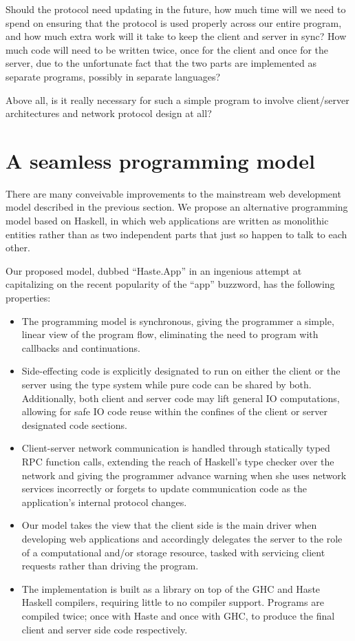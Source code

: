 \documentclass[preprint]{sigplanconf}
\begin{document}
Should the protocol need updating in the future, how much time will we need to
spend on ensuring that the protocol is used properly across our entire program,
and how much extra work will it take to keep the client and server in sync?
How much code will need to be written twice, once for the client and once for
the server, due to the unfortunate fact that the two parts are implemented as
separate programs, possibly in separate languages?

Above all, is it really necessary for such a simple program to involve
client/server architectures and network protocol design at all?

\section{A seamless programming model}

There are many conveivable improvements to the mainstream web development model
described in the previous section. We propose an alternative programming model
based on Haskell, in which web applications are written as monolithic entities
rather than as two independent parts that just so happen to talk to each other.

Our proposed model, dubbed ``Haste.App'' in an ingenious attempt at
capitalizing on the recent popularity of the ``app'' buzzword, has the
following properties:

\begin{itemize}
  \item The programming model is synchronous, giving the programmer a simple,
        linear view of the program flow, eliminating the need to program with
        callbacks and continuations.
  \item Side-effecting code is explicitly designated to run on either the
        client or the server using the type system while pure code can be
        shared by both. Additionally, both client and server code may lift
        general IO computations, allowing for safe IO code reuse within the
        confines of the client or server designated code sections.
  \item Client-server network communication is handled through statically typed
        RPC function calls, extending the reach of Haskell's type checker over
        the network and giving the programmer advance warning when she uses
        network services incorrectly or forgets to update communication code
        as the application's internal protocol changes.
  \item Our model takes the view that the client side is the main driver when
        developing web applications and accordingly delegates the server to
        the role of a computational and/or storage resource, tasked with
        servicing client requests rather than driving the program.
  \item The implementation is built as a library on top of the GHC and Haste
        Haskell compilers, requiring little to no compiler support. Programs
        are compiled twice; once with Haste and once with GHC, to produce the
        final client and server side code respectively.
\end{itemize}
\end{document}
